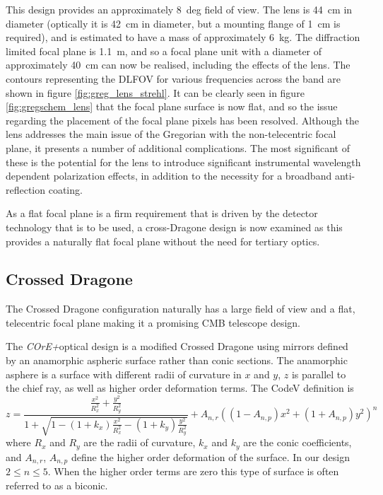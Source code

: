 \documentclass[11pt,a4paper]{article}
\newcommand{\comred}[1]{\textcolor{red}{#1}}
\newcommand{\coreplus}{\textit{\negthinspace COrE+\/}}
\begin{document}
This design provides an approximately 8~deg field of view. The lens is 44~cm in diameter (optically it is 42~cm in diameter, but a mounting flange of 1~cm is required), and is estimated to have a mass of approximately 6~kg. The diffraction limited focal plane is 1.1~m, and so a focal plane unit with a diameter of approximately 40~cm can now be realised, including the effects of the lens. The contours representing the DLFOV for various frequencies across the band are shown in figure \ref{fig:greg_lens_strehl}. It can be clearly seen in figure \ref{fig:gregschem_lens} that the focal plane surface is now flat, and so the issue regarding the placement of the focal plane pixels has been resolved. Although the lens addresses the main issue of the Gregorian with the non-telecentric focal plane, it presents a number of additional complications. The most significant of these is the potential for the lens to introduce significant instrumental wavelength dependent polarization effects, in addition to the necessity for a broadband anti-reflection coating.

As a flat focal plane is a firm requirement that is driven by the detector technology that is to be used, a cross-Dragone design is now examined as this provides a naturally flat focal plane without the need for tertiary optics.

\subsection{Crossed Dragone}

The Crossed Dragone configuration \cite{tran_2008, granet_2001} naturally has a large 
field of view and a flat, telecentric focal plane making it a promising CMB telescope design. 


The \coreplus optical design is a modified Crossed Dragone using mirrors defined by an anamorphic aspheric 
surface rather than conic sections. 
The anamorphic asphere is a surface with different radii of curvature in $x$ and $y$, $z$ is parallel to 
the chief ray, 
as well as higher order deformation terms.
The CodeV definition is 
$$ z = \frac{\frac{x^2}{R_x^2} + \frac{y^2}{R_y^2}}
{ 1 + \sqrt{1 - (1+k_x) \frac{x^2}{R_x^2} - (1+k_y) \frac{y^2}{R_y^2}}}
+ A_{n,r} ( (1-A_{n,p})x^2 + (1 + A_{n,p})y^2)^n
$$
where $R_x$ and $R_y$ are the radii of curvature, $k_x$ and $k_y$ are the conic coefficients, and $A_{n,r}$, $A_{n,p}$
define the higher order deformation of the surface. In our design $2 \leq n \leq 5$. When the higher order terms are zero this 
type of surface is often referred to as a biconic.
\end{document}
